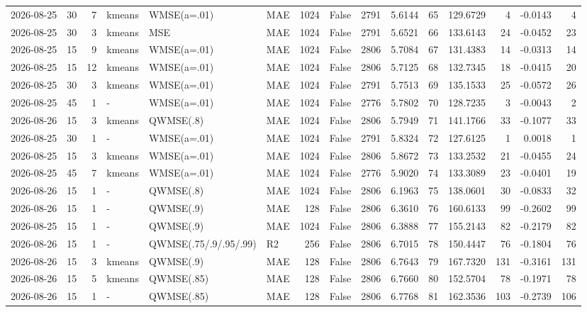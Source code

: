 \documentclass[10pt]{article}
\begin{document}
\begin{landscape}
\begin{longtable}{@{}lrrlllrcrrrrrrr@{}}
2026-08-25 & 30 & 7 & kmeans & WMSE(a=.01) & MAE & 1024 & False & 2791 & 5.6144 & 65 & 129.6729 & 4 & -0.0143 & 4 \\
2026-08-25 & 30 & 3 & kmeans & MSE & MAE & 1024 & False & 2791 & 5.6521 & 66 & 133.6143 & 24 & -0.0452 & 23 \\
2026-08-25 & 15 & 9 & kmeans & WMSE(a=.01) & MAE & 1024 & False & 2806 & 5.7084 & 67 & 131.4383 & 14 & -0.0313 & 14 \\
2026-08-25 & 15 & 12 & kmeans & WMSE(a=.01) & MAE & 1024 & False & 2806 & 5.7125 & 68 & 132.7345 & 18 & -0.0415 & 20 \\
2026-08-25 & 30 & 3 & kmeans & WMSE(a=.01) & MAE & 1024 & False & 2791 & 5.7513 & 69 & 135.1533 & 25 & -0.0572 & 26 \\
2026-08-25 & 45 & 1 & - & WMSE(a=.01) & MAE & 1024 & False & 2776 & 5.7802 & 70 & 128.7235 & 3 & -0.0043 & 2 \\
2026-08-26 & 15 & 3 & kmeans & QWMSE(.8) & MAE & 1024 & False & 2806 & 5.7949 & 71 & 141.1766 & 33 & -0.1077 & 33 \\
2026-08-25 & 30 & 1 & - & WMSE(a=.01) & MAE & 1024 & False & 2791 & 5.8324 & 72 & 127.6125 & 1 & 0.0018 & 1 \\
2026-08-25 & 15 & 3 & kmeans & WMSE(a=.01) & MAE & 1024 & False & 2806 & 5.8672 & 73 & 133.2532 & 21 & -0.0455 & 24 \\
2026-08-25 & 45 & 7 & kmeans & WMSE(a=.01) & MAE & 1024 & False & 2776 & 5.9020 & 74 & 133.3089 & 23 & -0.0401 & 19 \\
2026-08-26 & 15 & 1 & - & QWMSE(.8) & MAE & 1024 & False & 2806 & 6.1963 & 75 & 138.0601 & 30 & -0.0833 & 32 \\
2026-08-26 & 15 & 1 & - & QWMSE(.9) & MAE & 128 & False & 2806 & 6.3610 & 76 & 160.6133 & 99 & -0.2602 & 99 \\
2026-08-25 & 15 & 1 & - & QWMSE(.9) & MAE & 1024 & False & 2806 & 6.3888 & 77 & 155.2143 & 82 & -0.2179 & 82 \\
2026-08-26 & 15 & 1 & - & QWMSE(.75/.9/.95/.99) & R2 & 256 & False & 2806 & 6.7015 & 78 & 150.4447 & 76 & -0.1804 & 76 \\
2026-08-26 & 15 & 3 & kmeans & QWMSE(.9) & MAE & 128 & False & 2806 & 6.7643 & 79 & 167.7320 & 131 & -0.3161 & 131 \\
2026-08-26 & 15 & 5 & kmeans & QWMSE(.85) & MAE & 128 & False & 2806 & 6.7660 & 80 & 152.5704 & 78 & -0.1971 & 78 \\
2026-08-26 & 15 & 1 & - & QWMSE(.85) & MAE & 128 & False & 2806 & 6.7768 & 81 & 162.3536 & 103 & -0.2739 & 106 \\

\end{longtable}
\end{landscape}
\end{document}
